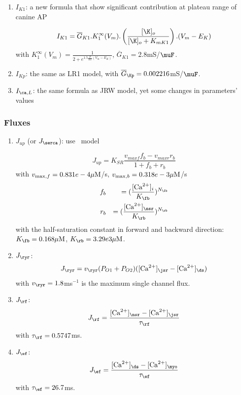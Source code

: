 \begin{enumerate}
\item $I_{K1}$: a new formula that show significant contribution at
  plateau range of canine AP

  \begin{equation}
    \label{eq:1059}
    I_{K1} = \overline{G}_{K1}.K^\infty_1(V_m).\left( \frac{[\K]_o}{[\K]_o+K_{mK1}}\right).(V_m-E_K)
  \end{equation}
with $K^\infty_1(V_m) = \frac{1}{2+e^{1.5\frac{F}{RT}(V_m-E_K)}}$, $\overline{G}_{K1}=2.8$mS/$\muF$.

\item $I_{Kp}$: the same as LR1 model, with $\overline{G}_\Kp=0.002216$mS/$\muF$.

\item $I_{\ca,L}$: the same formula as JRW model, yet some changes in
  parameters' values

\end{enumerate}

\subsubsection{Fluxes}
\label{sec:fluxes-6}

\begin{enumerate}
\item $J_{up}$ (or $J_\serca$): use~\citep{shannon2000rms} model

  \begin{equation}
    \label{eq:1060}
    J_{up} = K_{SR}\frac{v_{maxf}f_b-v_{maxr}r_b}{1+f_b+r_b}
  \end{equation}
with $v_{\max,f} = 0.831e-4{\mu\text{M}}$/s, $v_{\max,b}=0.318e-3{\mu\text{M}}$/s
\begin{eqnarray}
  \label{eq:1312}
  f_b &&= (\frac{[\Ca]_i}{K_\fb})^{N_\fb} \\
    r_b &&= (\frac{[\Ca]_\nsr}{K_\rb})^{N_\rb} \\
\end{eqnarray}
with the half-saturation constant in forward and backward direction:
$K_\fb=0.168\muM$, $K_\rb=3.29e3\muM$.


\item $J_\ryr$: 
  \begin{equation}
    \label{eq:1319}
    J_\ryr = v_\ryr (P_{O1}+P_{O2})([\Ca]_\jsr-[\Ca]_\ds)
  \end{equation}
with $v_\ryr=1.8$ms$^{-1}$ is the maximum single channel flux.
\item $J_\rf$:
  \begin{equation}
    \label{eq:1320}
    J_\rf = \frac{[\Ca]_\nsr-[\Ca]_\jsr}{\tau_\rf}
  \end{equation}
with $\tau_\rf = 0.5747$ms. 

\item $J_\ef$: 
  \begin{equation}
    \label{eq:1322}
    J_\ef = \frac{[\Ca]_\ds-[\Ca]_\myo}{\tau_\ef}
  \end{equation}
with $\tau_\ef=26.7$ms. 

\end{enumerate}


